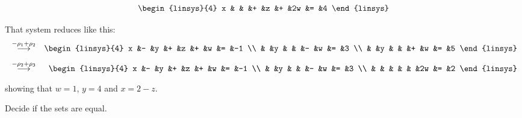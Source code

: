 \begin{exercises}
\begin{equation*}
\begin{linsys}{4}
         x  &   &   &+  &z  &+  &2w &=  &4
       \end{linsys}
    \end{equation*}
    \begin{answer}
      That system reduces like this:
      \begin{eqnarray*}
         &\grstep{-\rho_1+\rho_2}
         &\begin{linsys}{4}
           x  &-  &y  &+  &z  &+  &w  &=  &-1  \\
              &   &y  &   &   &-  &w  &=  &3   \\
              &   &y  &   &   &+  &w  &=  &5   
           \end{linsys}                              \\
         &\grstep{-\rho_2+\rho_3}
         &\begin{linsys}{4}
           x  &-  &y  &+  &z  &+  &w  &=  &-1  \\
              &   &y  &   &   &-  &w  &=  &3   \\
              &   &   &   &   &   &2w &=  &2   
          \end{linsys}
      \end{eqnarray*}
      showing that \( w=1 \), \( y=4 \) and \( x=2-z \).   
    \end{answer}
  \recommended \item 
    Decide if the sets are equal.
\end{exercises}
